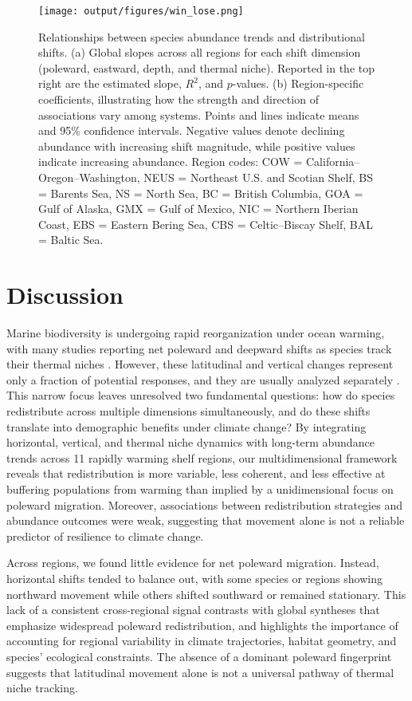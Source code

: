 \documentclass[11pt]{article}
\begin{document}
\begin{spacing}{1.5}
\begin{figure}[h]
    \centering
    \texttt{[image: output/figures/win\_lose.png]}
    \caption{
 Relationships between species abundance trends and distributional shifts. (a) Global slopes across all regions for each shift dimension (poleward, eastward, depth, and thermal niche). Reported in the top right are the estimated slope, $R^2$, and $p$-values. (b) Region-specific coefficients, illustrating how the strength and direction of associations vary among systems. Points and lines indicate means and 95\% confidence intervals. Negative values denote declining abundance with increasing shift magnitude, while positive values indicate increasing abundance. Region codes: COW = California–Oregon–Washington, NEUS = Northeast U.S. and Scotian Shelf, BS = Barents Sea, NS = North Sea, BC = British Columbia, GOA = Gulf of Alaska, GMX = Gulf of Mexico, NIC = Northern Iberian Coast, EBS = Eastern Bering Sea, CBS = Celtic–Biscay Shelf, BAL = Baltic Sea.}
    \label{fig:win_lose}
\end{figure}


\section{Discussion}

Marine biodiversity is undergoing rapid reorganization under ocean warming, with many studies reporting net poleward and deepward shifts as species track their thermal niches \citep{parmesan_globally_2003, perry_climate_2005, dulvy_climate_2008}. However, these latitudinal and vertical changes represent only a fraction of potential responses, and they are usually analyzed separately \citep{fredston_reimagining_2025}. This narrow focus leaves unresolved two fundamental questions: how do species redistribute across multiple dimensions simultaneously, and do these shifts translate into demographic benefits under climate change? By integrating horizontal, vertical, and thermal niche dynamics with long-term abundance trends across 11 rapidly warming shelf regions, our multidimensional framework reveals that redistribution is more variable, less coherent, and less effective at buffering populations from warming than implied by a unidimensional focus on poleward migration. Moreover, associations between redistribution strategies and abundance outcomes were weak, suggesting that movement alone is not a reliable predictor of resilience to climate change.

Across regions, we found little evidence for net poleward migration. Instead, horizontal shifts tended to balance out, with some species or regions showing northward movement while others shifted southward or remained stationary. This lack of a consistent cross-regional signal contrasts with global syntheses that emphasize widespread poleward redistribution, and highlights the importance of accounting for regional variability in climate trajectories, habitat geometry, and species’ ecological constraints. The absence of a dominant poleward fingerprint suggests that latitudinal movement alone is not a universal pathway of thermal niche tracking.



\end{spacing}
\end{document}
